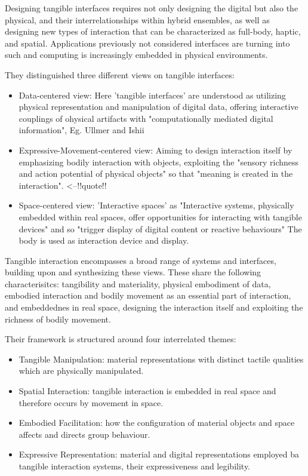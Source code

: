 Designing tangible interfaces requires not only designing the digital but also the physical, and their interrelationships within hybrid ensembles, as well as designing new types of interaction that can be characterized as full-body, haptic, and spatial.
Applications previously not considered interfaces are turning into such and computing is increasingly embedded in physical environments.

They distinguished three different views on tangible interfaces:
\begin{itemize}
\item Data-centered view: Here 'tangible interfaces' are understood as utilizing physical representation and manipulation of digital data, offering interactive couplings of ohysical artifacts with "computationally mediated digital information", Eg. Ullmer and Ishii
\item Expressive-Movement-centered view: Aiming to design interaction itself by emphasizing bodily interaction with objects, exploiting the "sensory richness and action potential of physical objects" so that "meaning is created in the interaction". <--!!quote!!
\item Space-centered view: 'Interactive spaces' as "Interactive systems, physically embedded within real spaces, offer opportunities for interacting with tangible devices" and so "trigger display of digital content or reactive behaviours" The body is used as interaction device and display.
\end{itemize}

Tangible interaction encompasses a broad range of systems and interfaces, building upon and synthesizing these views. These share the following characterisitcs: tangibility and materiality, physical embodiment of data, embodied interaction and bodily movement as an essential part of interaction, and embeddednes in real space, designing the interaction itself and exploiting the richness of bodily movement.

Their framework is structured around four interrelated themes:
\begin{itemize}
\item Tangible Manipulation:  material representations with distinct tactile qualities which are physically manipulated.
\item Spatial Interaction: tangible interaction is embedded in real space and therefore occurs by movement in space.
\item Embodied Facilitation: how the configuration of material objects and space affects and directs group behaviour.
\item Expressive Representation: material and digital representations employed ba tangible interaction systems, their expressiveness and legibility.
\end{itemize}




